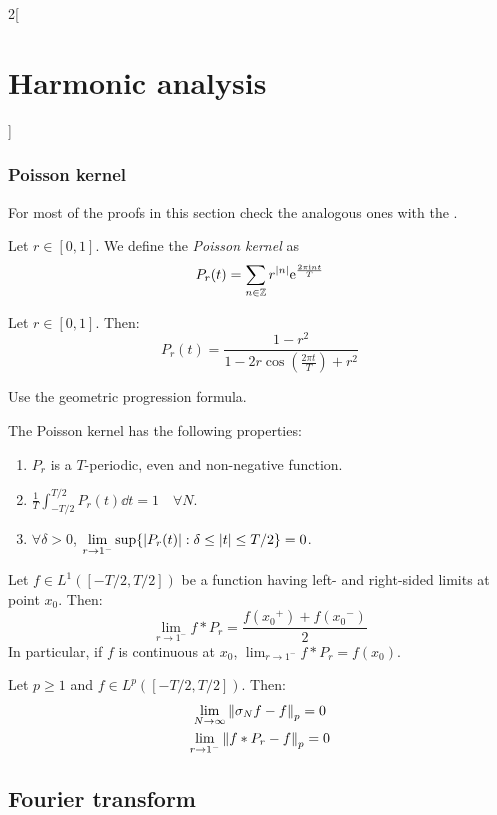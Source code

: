 \documentclass[../../../main_math.tex]{subfiles}
\begin{document}
\begin{multicols}{2}[\section{Harmonic analysis}]
  \subsubsection{Poisson kernel}
  For most of the proofs in this section check the analogous ones with the .
  \begin{definition}
    Let $r\in[0,1]$. We define the \emph{Poisson kernel} as $$P_r(t)=\sum_{n\in\mathbb{Z}}r^{\abs{n}}\mathrm{e}^{\frac{2\pi\mathrm{i} n t}{T}}$$
  \end{definition}
  \begin{lemma}\label{HA:poisskernelchar}
    Let $r\in[0,1]$. Then:
    $$P_r(t)=\frac{1-r^2}{1-2r\cos\left(\frac{2\pi t}{T}\right)+r^2}$$
  \end{lemma}
  \begin{sproof}
    Use the geometric progression formula.
  \end{sproof}
  \begin{proposition}\label{HA:poissprop}
    The Poisson kernel has the following properties:
    \begin{enumerate}
      \item $P_r$ is a $T$-periodic, even and non-negative function.
      \item $\displaystyle\frac{1}{T}\int_{-T/2}^{T/2}P_r(t)\dd{t}=1\quad\forall N$.
      \item $\forall\delta>0$, $\displaystyle\lim_{r\to 1^-}\sup\{\abs{P_r(t)}:\delta\leq\abs{t}\leq T/2\}=0$.
    \end{enumerate}
  \end{proposition}
  \begin{theorem}
    Let $f\in L^1([-T/2,T/2])$ be a function having left- and right-sided limits at point $x_0$. Then: $$\lim_{r\to 1^-}f*P_r=\frac{f({x_0}^+)+f({x_0}^-)}{2}$$ In particular, if $f$ is continuous at $x_0$, $\displaystyle\lim_{r\to 1^-}f*P_r=f(x_0)$.
  \end{theorem}
  \begin{theorem}
    Let $p\geq 1$ and $f\in L^p([-T/2,T/2])$. Then:
    \begin{gather*}
      \lim_{N\to\infty}\left\|\sigma_Nf-f\right\|_p=0\\
      \lim_{r\to 1^-}\left\|f*P_r-f\right\|_p=0
    \end{gather*}
  \end{theorem}
  \subsection{Fourier transform}

\end{multicols}
\end{document}

